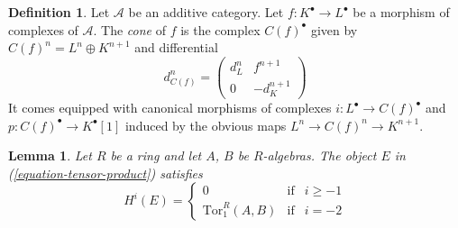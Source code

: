 \documentclass{amsart}
\theoremstyle{plain}
\newtheorem{lemma}[subsection]{Lemma}
\theoremstyle{definition}
\newtheorem{definition}[subsection]{Definition}
\theoremstyle{remark}
\numberwithin{equation}{subsection}
\begin{document}
\begin{definition}
\label{derived-definition-cone}
Let $\mathcal{A}$ be an additive category.
Let $f : K^\bullet \to L^\bullet$ be a morphism of
complexes of $\mathcal{A}$. The {\it cone} of $f$
is the complex $C(f)^\bullet$ given by
$C(f)^n = L^n \oplus K^{n + 1}$ and
differential
$$
d_{C(f)}^n =
\left(
\begin{matrix}
d^n_L & f^{n + 1} \\
0 & -d_K^{n + 1}
\end{matrix}
\right)
$$
It comes equipped with canonical morphisms of complexes
$i : L^\bullet \to C(f)^\bullet$ and $p : C(f)^\bullet \to K^\bullet[1]$
induced by the obvious maps $L^n \to C(f)^n \to K^{n + 1}$.
\end{definition}

\begin{lemma}
\label{lemma-tensor-product}
Let $R$ be a ring and let $A$, $B$ be $R$-algebras. The object $E$
in (\ref{equation-tensor-product}) satisfies
$$
H^i(E) =
\left\{
\begin{matrix}
0 & \text{if} & i \geq -1 \\
\text{Tor}_1^R(A, B) & \text{if} & i = -2
\end{matrix}
\right.
$$
\end{lemma}
\end{document}
